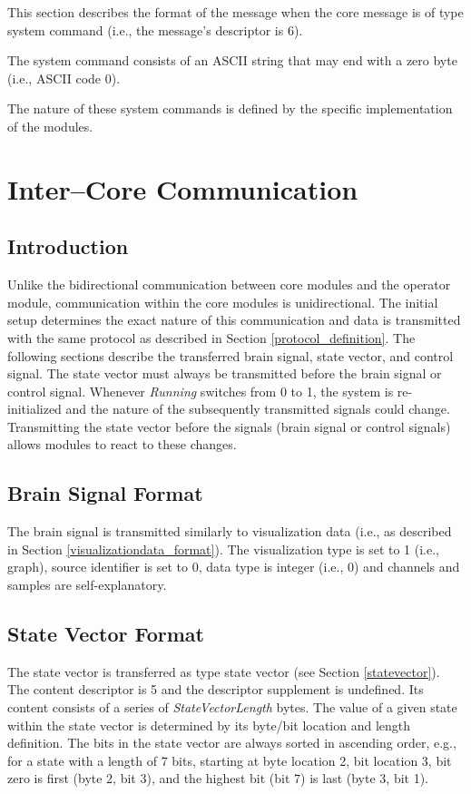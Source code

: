\documentclass[letterpaper,oneside,12pt]{book}
\begin{document}
This section describes the format of the message when the core message is of 
type system command (i.e., the message's descriptor is 6). 

The system command consists of an ASCII string that may end with a zero byte 
(i.e., ASCII code 0).

The nature of these system commands is defined by the specific implementation of 
the modules.


\section{Inter--Core Communication}

\subsection{Introduction}

Unlike the bidirectional communication between core modules and the operator 
module, communication within the core modules is unidirectional. The initial 
setup determines the exact nature of this communication and data is transmitted 
with the same protocol as described in Section \ref{protocol_definition}. The 
following sections describe the transferred brain signal, state vector, and 
control signal. The state vector must always be transmitted before the brain 
signal or control signal. Whenever \textit{Running} switches from 0 to 1, the 
system is re-initialized and the nature of the subsequently transmitted signals 
could change. Transmitting the state vector before the signals (brain signal or 
control signals) allows modules to react to these changes.

\subsection{Brain Signal Format}
\label{sec:eegsigformat}

The brain signal is transmitted similarly to visualization data (i.e., as 
described in Section \ref{visualizationdata_format}). The visualization type is 
set to 1 (i.e., graph), source identifier is set to 0, data type is integer 
(i.e., 0) and channels and samples are self-explanatory.


\subsection{State Vector Format}
\label{statevector_format}

The state vector is transferred as type state vector (see Section 
\ref{statevector}). The content descriptor is 5 and the descriptor supplement is 
undefined. Its content consists of a series of \textit{StateVectorLength} bytes. 
The value of a given state within the state vector is determined by its byte/bit 
location and length definition. The bits in the state vector are always sorted 
in ascending order, e.g., for a state with a length of 7 bits, starting at byte 
location 2, bit location 3, bit zero is first (byte 2, bit 3), and the highest 
bit (bit 7) is last (byte 3, bit 1).
\end{document}
